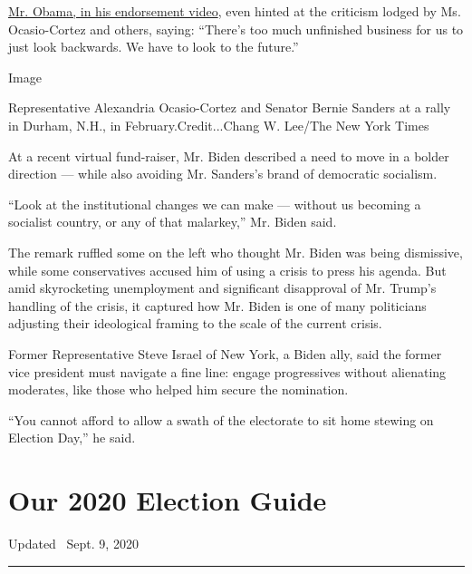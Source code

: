 \href{https://www.nytimes3xbfgragh.onion/2020/04/14/us/politics/obama-endorses-biden.html}{Mr.
Obama, in his endorsement video}, even hinted at the criticism lodged by
Ms. Ocasio-Cortez and others, saying: ``There's too much unfinished
business for us to just look backwards. We have to look to the future.''

Image

Representative Alexandria Ocasio-Cortez and Senator Bernie Sanders at a
rally in Durham, N.H., in February.Credit...Chang W. Lee/The New York
Times

At a recent virtual fund-raiser, Mr. Biden described a need to move in a
bolder direction --- while also avoiding Mr. Sanders's brand of
democratic socialism.

``Look at the institutional changes we can make --- without us becoming
a socialist country, or any of that malarkey,'' Mr. Biden said.

The remark ruffled some on the left who thought Mr. Biden was being
dismissive, while some conservatives accused him of using a crisis to
press his agenda. But amid skyrocketing unemployment and significant
disapproval of Mr. Trump's handling of the crisis, it captured how Mr.
Biden is one of many politicians adjusting their ideological framing to
the scale of the current crisis.

Former Representative Steve Israel of New York, a Biden ally, said the
former vice president must navigate a fine line: engage progressives
without alienating moderates, like those who helped him secure the
nomination.

``You cannot afford to allow a swath of the electorate to sit home
stewing on Election Day,'' he said.

\hypertarget{our-2020-election-guide}{%
\section{Our 2020 Election Guide}\label{our-2020-election-guide}}

Updated ~Sept. 9, 2020

\begin{center}\rule{0.5\linewidth}{\linethickness}\end{center}

